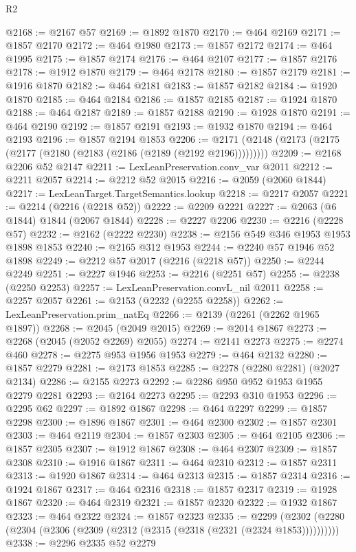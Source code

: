 \begin{lexlean}{R2}
\begin{coremodule}
@2168 := @2167 @57
@2169 := @1892 @1870
@2170 := @464 @2169
@2171 := @1857 @2170
@2172 := @464 @1980
@2173 := @1857 @2172
@2174 := @464 @1995
@2175 := @1857 @2174
@2176 := @464 @2107
@2177 := @1857 @2176
@2178 := @1912 @1870
@2179 := @464 @2178
@2180 := @1857 @2179
@2181 := @1916 @1870
@2182 := @464 @2181
@2183 := @1857 @2182
@2184 := @1920 @1870
@2185 := @464 @2184
@2186 := @1857 @2185
@2187 := @1924 @1870
@2188 := @464 @2187
@2189 := @1857 @2188
@2190 := @1928 @1870
@2191 := @464 @2190
@2192 := @1857 @2191
@2193 := @1932 @1870
@2194 := @464 @2193
@2196 := @1857 @2194 @1853
@2206 := @2171 (@2148 (@2173 (@2175 (@2177 (@2180 (@2183 (@2186 (@2189 (@2192 @2196)))))))))
@2209 := @2168 @2206 @52 @2147
@2211 := LexLeanPreservation.conv_var @2011
@2212 := @2211 @2057
@2214 := @2212 @52 @2015
@2216 := @2059 (@2060 @1844)
@2217 := LexLeanTarget.TargetSemantics.lookup
@2218 := @2217 @2057
@2221 := @2214 (@2216 (@2218 @52))
@2222 := @2209 @2221
@2227 := @2063 (@6 @1844) @1844 (@2067 @1844)
@2228 := @2227 @2206
@2230 := @2216 (@2228 @57)
@2232 := @2162 (@2222 @2230)
@2238 := @2156 @549 @346 @1953 @1953 @1898 @1853
@2240 := @2165 @312 @1953
@2244 := @2240 @57 @1946 @52 @1898
@2249 := @2212 @57 @2017 (@2216 (@2218 @57))
@2250 := @2244 @2249
@2251 := @2227 @1946
@2253 := @2216 (@2251 @57)
@2255 := @2238 (@2250 @2253)
@2257 := LexLeanPreservation.convL_nil @2011
@2258 := @2257 @2057
@2261 := @2153 (@2232 (@2255 @2258))
@2262 := LexLeanPreservation.prim_natEq
@2266 := @2139 (@2261 (@2262 @1965 @1897))
@2268 := @2045 (@2049 @2015)
@2269 := @2014 @1867
@2273 := @2268 (@2045 (@2052 @2269) @2055)
@2274 := @2141 @2273
@2275 := @2274 @460
@2278 := @2275 @953 @1956 @1953
@2279 := @464 @2132
@2280 := @1857 @2279
@2281 := @2173 @1853
@2285 := @2278 (@2280 @2281) (@2027 @2134)
@2286 := @2155 @2273
@2292 := @2286 @950 @952 @1953 @1955 @2279 @2281
@2293 := @2164 @2273
@2295 := @2293 @310 @1953
@2296 := @2295 @62
@2297 := @1892 @1867
@2298 := @464 @2297
@2299 := @1857 @2298
@2300 := @1896 @1867
@2301 := @464 @2300
@2302 := @1857 @2301
@2303 := @464 @2119
@2304 := @1857 @2303
@2305 := @464 @2105
@2306 := @1857 @2305
@2307 := @1912 @1867
@2308 := @464 @2307
@2309 := @1857 @2308
@2310 := @1916 @1867
@2311 := @464 @2310
@2312 := @1857 @2311
@2313 := @1920 @1867
@2314 := @464 @2313
@2315 := @1857 @2314
@2316 := @1924 @1867
@2317 := @464 @2316
@2318 := @1857 @2317
@2319 := @1928 @1867
@2320 := @464 @2319
@2321 := @1857 @2320
@2322 := @1932 @1867
@2323 := @464 @2322
@2324 := @1857 @2323
@2335 := @2299 (@2302 (@2280 (@2304 (@2306 (@2309 (@2312 (@2315 (@2318 (@2321 (@2324 @1853))))))))))
@2338 := @2296 @2335 @52 @2279

\end{coremodule}
\end{lexlean}
